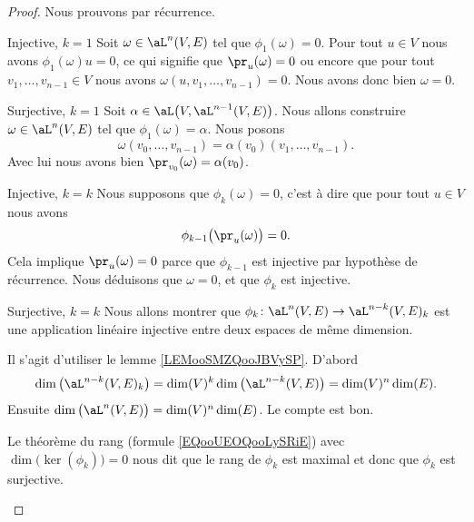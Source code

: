 \begin{proof}
    Nous prouvons par récurrence. 
    \begin{subproof}
        \item[Injective, \( k=1\)]
            Soit \( \omega\in \aL^n(V,E)\) tel que \( \phi_1(\omega)=0\). Pour tout \( u\in V\) nous avons \( \phi_1(\omega)u=0\), ce qui signifie que \( \pr_u(\omega)=0\) ou encore que pour tout \( v_1,\ldots, v_{n-1}\in V\) nous avons \( \omega(u,v_1,\ldots, v_{n-1})=0\). Nous avons donc bien \( \omega=0\).
        \item[Surjective, \( k=1\)]
            Soit \( \alpha\in\aL\big( V,\aL^{n-1}(V,E) \big)\). Nous allons construire \( \omega\in \aL^n(V,E)\) tel que \( \phi_1(\omega)=\alpha\). Nous posons
            \begin{equation}
                \omega(v_0,\ldots, v_{n-1})=\alpha(v_0)(v_1,\ldots, v_{n-1}).
            \end{equation}
            Avec lui nous avons bien \( \pr_{v_0}(\omega)=\alpha(v_0)\).
        \item[Injective, \( k=k\)]
            Nous supposons que \( \phi_k(\omega)=0\), c'est à dire que pour tout \( u\in V\) nous avons 
            \begin{equation}
                \phi_{k-1}\big( \pr_u(\omega) \big)=0.
            \end{equation}
            Cela implique \( \pr_u(\omega)=0\) parce que \( \phi_{k-1}\) est injective par hypothèse de récurrence. Nous déduisons que \( \omega=0\), et que \( \phi_k\) est injective.

        \item[Surjective, \( k=k\)]
            Nous allons montrer que \(   \phi_k\colon \aL^n(V,E)\to \aL^{n-k}(V,E)_k  \) est une application linéaire injective entre deux espaces de même dimension.

            Il s'agit d'utiliser le lemme \ref{LEMooSMZQooJBVySP}. D'abord
            \begin{equation}
                \dim\big( \aL^{n-k}(V,E)_k \big)=\dim(V)^k\dim\big( \aL^{n-k}(V,E) \big)=\dim(V)^n\dim(E).
            \end{equation}
            Ensuite \( \dim\big( \aL^n(V,E) \big)=\dim(V)^n\dim(E)\). Le compte est bon.

            Le théorème du rang (formule \eqref{EQooUEOQooLySRiE}) avec \( \dim\big( \ker(\phi_k) \big)=0\) nous dit que le rang de \( \phi_k\) est maximal et donc que \( \phi_k\) est surjective.
    \end{subproof}
\end{proof}

